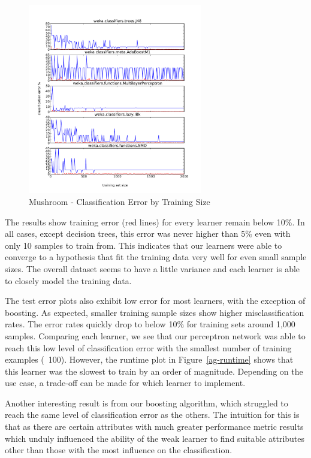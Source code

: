 \documentclass{sig-alternate}
\begin{document}
\begin{figure}
    \centering
    \includegraphics[width=3in]{data/agaricus-lepiota/learning-curve-10to2000/stacked-test-error.pdf}
    \caption{Mushroom - Classification Error by Training Size \label{ag-error}}
\end{figure} 

The results show training error (red lines) for every learner remain below 10\%. In all cases, except decision trees, this error was never higher than 5\% even with only 10 samples to train from. This indicates that our learners were able to converge to a hypothesis that fit the training data very well for even small sample sizes. The overall dataset seems to have a little variance and each learner is able to closely model the training data.

The test error plots also exhibit low error for most learners, with the exception of boosting. As expected, smaller training sample sizes show higher misclassification rates. The error rates quickly drop to below 10\% for training sets around 1,000 samples. Comparing each learner, we see that our perceptron network was able to reach this low level of classification error with the smallest number of training examples (~100). However, the runtime plot in Figure~\ref{ag-runtime} shows that this learner was the slowest to train by an order of magnitude. Depending on the use case, a trade-off can be made for which learner to implement.

Another interesting result is from our boosting algorithm, which struggled to reach the same level of classification error as the others. The intuition for this is that as there are certain attributes with much greater performance metric results which unduly influenced the ability of the weak learner to find suitable attributes other than those with the most influence on the classification.
\end{document}
